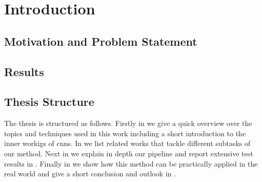 %
\chapter{Introduction}
\label{sec:intro}

\section{Motivation and Problem Statement}
\label{sec:intro:motivation}

\section{Results}
\label{sec:intro:results}

\section{Thesis Structure}
\label{sec:intro:structure}
The thesis is structured as follows. Firstly in \textbf{} we give a quick overview over the topics and techniques used in this work including a short introduction to the inner workigs of \glspl{cnn}. In \textbf{} we list related works that tackle different subtasks of our method. Next in \textbf{} we explain in depth our pipeline and report extensive test results in \textbf{}. Finally in \textbf{} we show how this method can be practically applied in the real world and give a short conclusion and outlook in \textbf{}.
